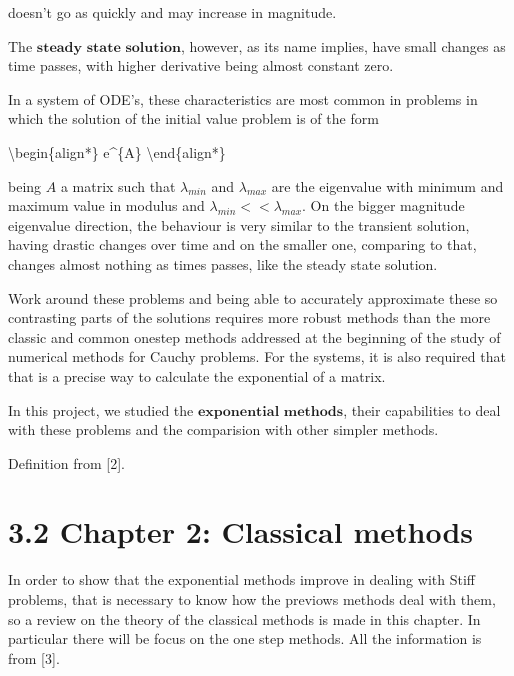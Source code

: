 \documentclass[letterpaper,10pt,english]{jupyterBook}
\begin{document}
\sphinxAtStartPar
doesn’t go as quickly and may increase in magnitude.

\sphinxAtStartPar
The \(\textbf{steady state solution}\), however, as its name implies, have small changes as time passes, with higher derivative being almost constant zero.

\sphinxAtStartPar
In a system of ODE’s, these characteristics are most common in problems in which the solution of the initial value problem is of the form

\sphinxAtStartPar
\textbackslash{}begin\{align*\}
e\textasciicircum{}\{A\}
\textbackslash{}end\{align*\}

\sphinxAtStartPar
being \(A\) a matrix such that \(\lambda_{min}\) and \(\lambda_{max}\) are the eigenvalue with minimum and maximum value in modulus and \(\lambda_{min} << \lambda_{max}\). On the bigger magnitude eigenvalue direction, the behaviour is very similar to the transient solution, having drastic changes over time and on the smaller one, comparing to that, changes almost nothing as times passes, like the steady state solution.

\sphinxAtStartPar
Work around these problems and being able to accurately approximate these so contrasting parts of the solutions requires more robust methods than the more classic and common one\sphinxhyphen{}step methods addressed at the beginning of the study of numerical methods for Cauchy problems. For the systems, it is also required that that is a precise way to calculate the exponential of a matrix.

\sphinxAtStartPar
In this project, we studied the \(\textbf{exponential methods}\), their capabilities to deal with these problems and the comparision with other simpler methods.

\sphinxAtStartPar
Definition from {[}2{]}.

\sphinxstepscope


\section{3.2 Chapter 2: Classical methods}
\label{\detokenize{cap2:chapter-2-classical-methods}}\label{\detokenize{cap2::doc}}
\sphinxAtStartPar
In order to show that the exponential methods improve in dealing with Stiff problems, that is necessary to know how the previows methods deal with them, so a review on the theory of the classical methods is made in this chapter. In particular there will be focus on the one step methods. All the information is from {[}3{]}.
\end{document}
